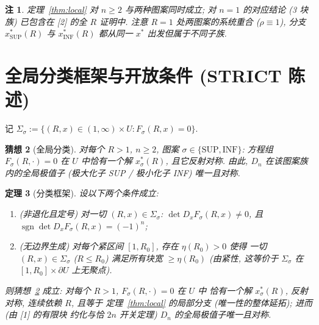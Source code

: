 \documentclass[UTF8]{ctexart}
\newtheorem{theorem}{定理}[section]
\newtheorem{remark}[theorem]{注}
\newtheorem{conjecture}[theorem]{猜想}
\begin{document}
\begin{remark}
定理~\ref{thm:local} 对 $n\ge2$ 与两种图案同时成立; 对 $n=1$ 的对应结论
(3 块族) 已包含在 [2] 的全 $R$ 证明中. 注意 $R=1$ 处两图案的系统重合
($\rho\equiv1$), 分支 $x_\mathrm{SUP}^*(R)$ 与 $x_\mathrm{INF}^*(R)$ 都从同一
$x^*$ 出发但属于不同子族.
\end{remark}

\section{全局分类框架与开放条件 (STRICT 陈述)}\label{sec:global}

记 $\Sigma_\sigma:=\{(R,x)\in(1,\infty)\times U: F_\sigma(R,x)=0\}$.

\begin{conjecture}[全局分类]\label{conj:global}
对每个 $R>1$, $n\ge2$, 图案 $\sigma\in\{\mathrm{SUP},\mathrm{INF}\}$:
方程组 $F_\sigma(R,\cdot)=0$ 在 $U$ 中恰有一个解 $x_\sigma^*(R)$, 且它反射对称.
由此, $D_n$ 在该图案族内的全局极值子 (极大化子 SUP / 极小化子 INF) 唯一且对称.
\end{conjecture}

\begin{theorem}[分类框架]\label{thm:framework}
设以下两个条件成立:
\begin{enumerate}
	\item[(G1$'$)] (非退化且定号) 对一切 $(R,x)\in\Sigma_\sigma$:
	$\det D_xF_\sigma(R,x)\neq0$, 且 $\operatorname{sgn}\det D_xF_\sigma(R,x)=(-1)^n$;
	\item[(G2)] (无边界生成) 对每个紧区间 $[1,R_0]$, 存在 $\eta(R_0)>0$ 使得
	一切 $(R,x)\in\Sigma_\sigma$ ($R\le R_0$) 满足所有块宽 $\ge\eta(R_0)$
	(由紧性, 这等价于 $\Sigma_\sigma$ 在 $[1,R_0]\times\partial U$ 上无聚点).
\end{enumerate}
则猜想~\ref{conj:global} 成立: 对每个 $R>1$, $F_\sigma(R,\cdot)=0$ 在 $U$ 中
恰有一个解 $x_\sigma^*(R)$, 反射对称, 连续依赖 $R$, 且等于
定理~\ref{thm:local} 的局部分支 (唯一性的整体延拓); 进而 (由 [1] 的有限块
约化与恰 $2n$ 开关定理) $D_n$ 的全局极值子唯一且对称.
\end{theorem}
\end{document}
